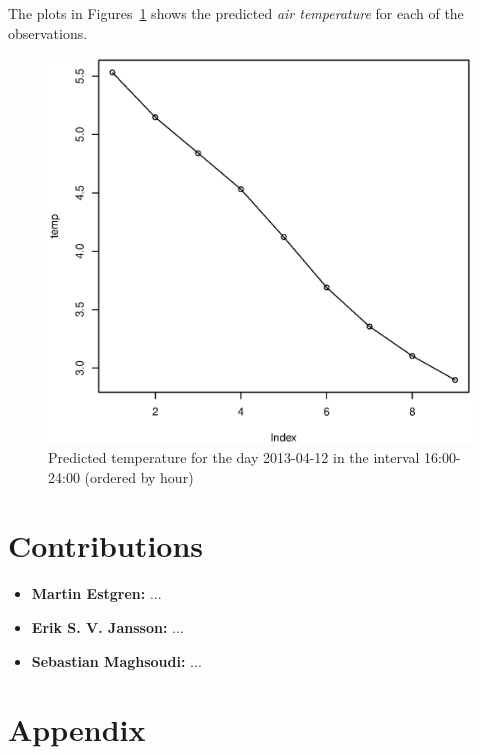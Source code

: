 \documentclass[a4paper, twocolumn]{article}
\begin{document}
    The plots in Figures~\ref{fig:result} shows the predicted \textit{air temperature} for each of the observations. 
    \begin{figure}[!h]
    \centering
    \caption{Predicted temperature for the day 2013-04-12 in the interval 16:00-24:00 (ordered by hour)\label{fig:result}}
	    \begin{minipage}[]{0.4\textwidth}
	    	\includegraphics[width=\textwidth]{share/result.eps}
	    \end{minipage}
    \end{figure}


    \section*{Contributions}

    \begin{itemize}
    	\item{\textbf{Martin Estgren:} ...}
    	\item{\textbf{Erik S. V. Jansson:} ...}
    	\item{\textbf{Sebastian Maghsoudi:} ...}
    \end{itemize}

    \nocite{*} %
    
    
    \onecolumn \appendix
    \section*{Appendix}
 	


    
\end{document}
